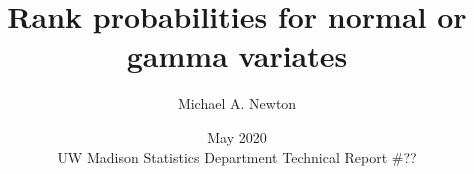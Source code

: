 \newcommand{\fulltitle}{Rank probabilities for normal or gamma variates}
\newcommand{\wrappedfulltitle}{Rank probabilities for normal or gamma variates}
  
\newcommand{\longdate}{May 2020 \\
  UW Madison Statistics Department Technical Report \#?? }
\newcommand{\shortdate}{2/10}
\newcommand{\keywords}{gamma ranking; Viterbi algorithm } 


 
\renewcommand{\baselinestretch}{1.2}
\title{\wrappedfulltitle}
\author{
 \renewcommand{\thefootnote}{\arabic{footnote}}
 Michael A. Newton\footnotemark[1]
 }

\vspace{1.5in}
\date{{\normalsize \longdate}}
\maketitle
{}
\renewcommand{\baselinestretch}{\doublespaced}

\newpage

